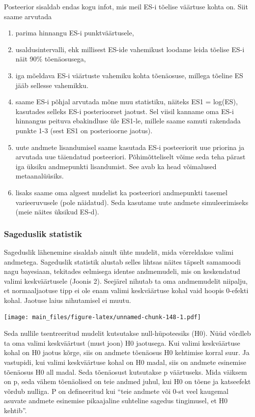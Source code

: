 \documentclass[]{book}
\begin{document}
Posteerior sisaldab endas kogu infot, mis meil ES-i tõelise väärtuse
kohta on. Siit saame arvutada

\begin{enumerate}
\def\labelenumi{\arabic{enumi}.}
\item
  parima hinnangu ES-i punktväärtusele,
\item
  usaldusintervalli, ehk millisest ES-ide vahemikust loodame leida
  tõelise ES-i näit 90\% tõenäosusega,
\item
  iga mõeldava ES-i väärtuste vahemiku kohta tõenäosuse, millega tõeline
  ES jääb sellesse vahemikku.
\item
  saame ES-i põhjal arvutada mõne muu statistiku, näiteks ES1 = log(ES),
  kasutades selleks ES-i posterioorset jaotust. Sel viisil kanname oma
  ES-i hinnangus peituva ebakindluse üle ES1-le, millele saame samuti
  rakendada punkte 1-3 (sest ES1 on posterioorne jaotus).
\item
  uute andmete lisandumisel saame kasutada ES-i posteeriorit uue
  priorina ja arvutada uue täiendatud posteeriori. Põhimõtteliselt võime
  seda teha pärast iga üksiku andmepunkti lisandumist. See avab ka head
  võimalused metaanalüüsiks.
\item
  lisaks saame oma algsest mudelist ka posteeriori andmepunkti tasemel
  varieeruvusele (pole näidatud). Seda kasutame uute andmete
  simuleerimiseks (meie näites üksikud ES-d).
\end{enumerate}

\subsubsection{Sageduslik statistik}\label{sageduslik-statistik}

Sageduslik lähenemine sisaldab ainult ühte mudelit, mida võrreldakse
valimi andmetega. Sageduslik statistik alustab selles lihtsas näites
täpselt samamoodi nagu bayesiaan, tekitades eelmisega identse
andmemudeli, mis on keskendatud valimi keskväärtusele (Joonis 2).
Seejärel nihutab ta oma andmemudelit niipalju, et normaaljaotuse tipp ei
ole enam valimi keskväärtuse kohal vaid hoopis 0-efekti kohal. Jaotuse
laius nihutamisel ei muutu.

\texttt{[image: main\_files/figure-latex/unnamed-chunk-148-1.pdf]}

Seda nullile tsentreeritud mudelit kutsutakse null-hüpoteesiks (H0).
Nüüd võrdleb ta oma valimi keskväärtust (must joon) H0 jaotusega. Kui
valimi keskväärtuse kohal on H0 jaotus kõrge, siis on andmete tõenäosus
H0 kehtimise korral suur. Ja vastupidi, kui valimi keskväärtuse kohal on
H0 madal, siis on andmete esinemise tõenäosus H0 all madal. Seda
tõenäosust kutsutakse p väärtuseks. Mida väiksem on p, seda vähem
tõenäolised on teie andmed juhul, kui H0 on tõene ja katseefekt võrdub
nulliga. P on defineeritud kui ``teie andmete või 0-st veel kaugemal
asuvate andmete esinemise pikaajaline suhteline sagedus tingimusel, et
H0 kehtib''.
\end{document}
